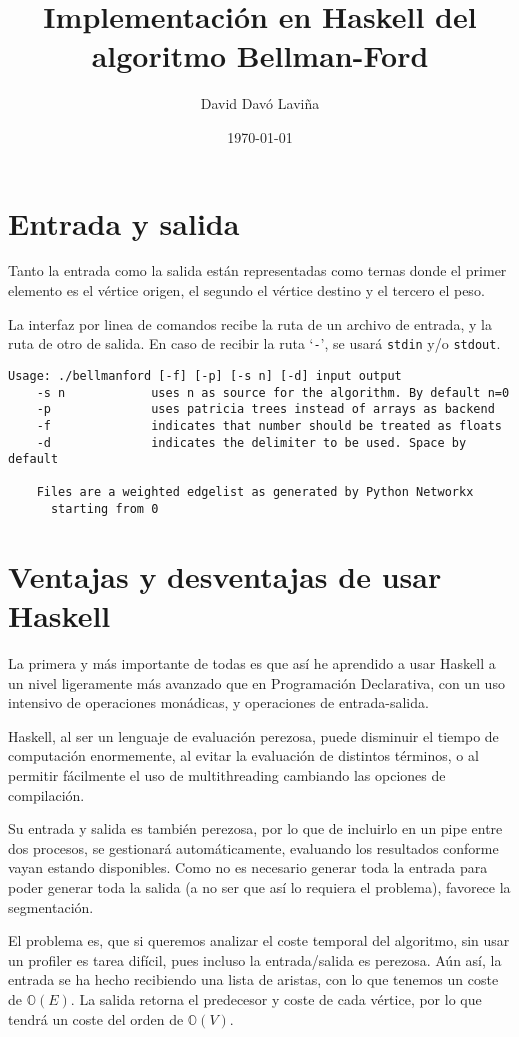 \documentclass{article}
\title{Implementación en Haskell del algoritmo Bellman-Ford}
\author{David Davó Laviña}
\date{\today{}}
\begin{document}
\section{Entrada y salida}
Tanto la entrada como la salida están representadas como ternas donde el primer elemento es el vértice origen, el segundo el vértice destino y el tercero el peso.

La interfaz por linea de comandos recibe la ruta de un archivo de entrada, y la ruta de otro de salida. En caso de recibir la ruta `\texttt{-}', se usará \texttt{stdin} y/o \texttt{stdout}.

\begin{verbatim}
Usage: ./bellmanford [-f] [-p] [-s n] [-d] input output
    -s n            uses n as source for the algorithm. By default n=0
    -p              uses patricia trees instead of arrays as backend
    -f              indicates that number should be treated as floats
    -d              indicates the delimiter to be used. Space by default

    Files are a weighted edgelist as generated by Python Networkx
      starting from 0
\end{verbatim}

\section{Ventajas y desventajas de usar Haskell}
La primera y más importante de todas es que así he aprendido a usar Haskell a un nivel ligeramente más avanzado que en Programación Declarativa, con un uso intensivo de operaciones monádicas, y operaciones de entrada-salida.

Haskell, al ser un lenguaje de evaluación perezosa, puede disminuir el tiempo de computación enormemente, al evitar la evaluación de distintos términos, o al permitir fácilmente el uso de multithreading cambiando las opciones de compilación.

Su entrada y salida es también perezosa, por lo que de incluirlo en un pipe entre dos procesos, se gestionará automáticamente, evaluando los resultados conforme vayan estando disponibles. Como no es necesario generar toda la entrada para poder generar toda la salida (a no ser que así lo requiera el problema), favorece la segmentación.

El problema es, que si queremos analizar el coste temporal del algoritmo, sin usar un profiler es tarea difícil, pues incluso la entrada/salida es perezosa. Aún así, la entrada se ha hecho recibiendo una lista de aristas, con lo que tenemos un coste de $\mathbb{O}\left(E\right)$. La salida retorna el predecesor y coste de cada vértice, por lo que tendrá un coste del orden de $\mathbb{O}\left(V\right)$.
\end{document}

